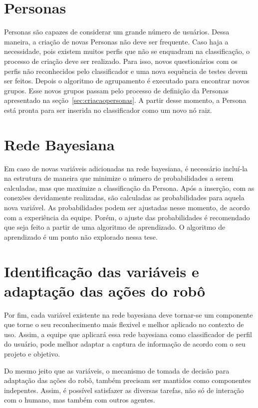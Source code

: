 \section{Personas}
\label{sec:personasnovas}
Personas são capazes de considerar um grande número de usuários. Dessa maneira, a criação de novas Personas não deve ser frequente. Caso haja a necessidade, pois existem muitos perfis que não se enquadram na classificação, o processo de criação deve ser realizado. Para isso, novos questionários com os perfis não reconhecidos pelo classificador e uma nova sequência de testes devem ser feitos. Depois o algoritmo de agrupamento é executado para encontrar novos grupos. Esse novos grupos passam pelo processo de definição da Personas apresentado na seção~\ref{sec:criacaopersonas}. A partir desse momento, a Persona está pronta para ser inserida no classificador como um novo nó raiz.

\section{Rede Bayesiana}
\label{sec:novarb}
Em caso de novas variáveis adicionadas na rede bayesiana, é necessário incluí-la na estrutura de maneira que minimize o número de probabilidades a serem calculadas, mas que maximize a classificação da Persona. Após a inserção, com as conexões devidamente realizadas, são calculadas as probabilidades para aquela nova variável. As probabilidades podem ser ajustadas nesse momento, de acordo com a experiência da equipe. Porém, o ajuste das probabilidades é recomendado que seja feito a partir de uma algoritmo de aprendizado. O algoritmo de aprendizado é um ponto não explorado nessa tese.

\section{Identificação das variáveis e adaptação das ações do robô}
\label{sec:ivaar}
Por fim, cada variável existente na rede bayesiana deve tornar-se um componente que torne o seu reconhecimento mais flexivel e melhor aplicado no contexto de uso. Assim, a equipe que aplicará essa rede bayesiana como classificador de perfil do usuário, pode melhor adaptar a captura de informação de acordo com o seu projeto e objetivo.

Do mesmo jeito que as variáveis, o mecanismo de tomada de decisão para adaptação das ações do robô, também precisam ser mantidos como componentes indepentes. Assim, é possível satisfazer as diversas tarefas, não só de interação com o humano, mas também com outros agentes.

